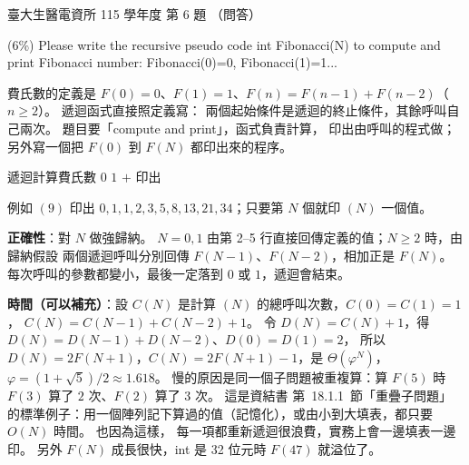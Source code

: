 \begin{pastexam}[label={px:ntu-115-bmei-alg-04}]{臺大生醫電資所 115 學年度 第 6 題}
（問答）

(6\%) Please write the recursive pseudo code int Fibonacci(N) to compute and print Fibonacci number:
Fibonacci(0)=0, Fibonacci(1)=1...
\end{pastexam}

\begin{pastsoln}
費氏數的定義是 $F(0) = 0$、$F(1) = 1$、$F(n) = F(n-1) + F(n-2)$（$n \ge 2$）。 遞迴函式直接照定義寫：
兩個起始條件是遞迴的終止條件，其餘呼叫自己兩次。 題目要「compute and print」，函式負責計算，
印出由呼叫的程式做；另外寫一個把 $F(0)$ 到 $F(N)$ 都印出來的程序。
\begin{pseudo}{遞迴計算費氏數}
 
        \State \Return $0$
        \State \Return $1$
    \Else
        \State \Return {} $+$ 
    \EndIf
\EndFunction
\Statex
{}
        \State 印出 
    \EndFor
\EndProcedure
\end{pseudo}
例如 $(9)$ 印出 $0, 1, 1, 2, 3, 5, 8, 13, 21, 34$；只要第 $N$ 個就印
$(N)$ 一個值。

\textbf{正確性}：對 $N$ 做強歸納。 $N = 0, 1$ 由第 2--5 行直接回傳定義的值；$N \ge 2$ 時，由歸納假設
兩個遞迴呼叫分別回傳 $F(N-1)$、$F(N-2)$，相加正是 $F(N)$。 每次呼叫的參數都變小，最後一定落到
$0$ 或 $1$，遞迴會結束。

\textbf{時間（可以補充）}：設 $C(N)$ 是計算 $(N)$ 的總呼叫次數，$C(0) = C(1) = 1$，
$C(N) = C(N-1) + C(N-2) + 1$。 令 $D(N) = C(N) + 1$，得 $D(N) = D(N-1) + D(N-2)$、$D(0) = D(1) = 2$，
所以 $D(N) = 2F(N+1)$，$C(N) = 2F(N+1) - 1$，是 $\Theta(\varphi^N)$，$\varphi = (1 + \sqrt 5)/2 \approx 1.618$。
慢的原因是同一個子問題被重複算：算 $F(5)$ 時 $F(3)$ 算了 $2$ 次、$F(2)$ 算了 $3$ 次。 這是資結書
第~18.1.1~節「重疊子問題」的標準例子：用一個陣列記下算過的值（記憶化），或由小到大填表，都只要
$O(N)$ 時間。 也因為這樣， 每一項都重新遞迴很浪費，實務上會一邊填表一邊印。
另外 $F(N)$ 成長很快，int 是 32 位元時 $F(47)$ 就溢位了。
\end{pastsoln}
